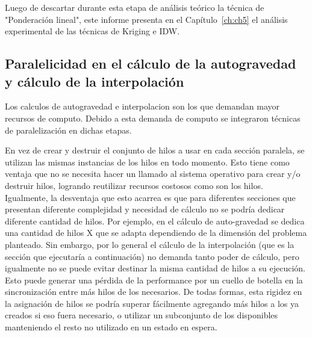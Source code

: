 \documentclass[a4paper,11pt]{book}
\begin{document}
Luego de descartar durante esta etapa de análisis teórico la técnica de "Ponderación lineal", este informe presenta en el Capítulo~\ref{ch:ch5} el análisis experimental de las técnicas de Kriging e IDW.


\subsection{Paralelicidad en el cálculo de la autogravedad y cálculo de la interpolación}



Los calculos de autogravedad e interpolacion son los que demandan mayor recursos de computo. Debido a esta demanda de computo se integraron técnicas de paralelización en dichas etapas.

En vez de crear y destruir el conjunto de hilos a usar en cada sección paralela, se utilizan las mismas instancias de los hilos en todo momento. Esto tiene como ventaja que no se necesita hacer un llamado al sistema operativo para crear y/o destruir hilos, logrando reutilizar recursos costosos como son los hilos. Igualmente, la desventaja que esto acarrea es que para diferentes secciones que presentan diferente complejidad y necesidad de cálculo no se podría dedicar diferente cantidad de hilos. Por ejemplo, en el cálculo de auto-gravedad se dedica una cantidad de hilos X que se adapta dependiendo de la dimensión del problema planteado. Sin embargo, por lo general el cálculo de la interpolación (que es la sección que ejecutaría a continuación) no demanda tanto poder de cálculo, pero igualmente no se puede evitar destinar la misma cantidad de hilos a su ejecución. Esto puede generar una pérdida de la performance por un cuello de botella en la sincronización entre más hilos de los necesarios. De todas formas, esta rigidez en la asignación de hilos se podría superar fácilmente agregando más hilos a los ya creados si eso fuera necesario, o utilizar un subconjunto de los disponibles manteniendo el resto no utilizado en un estado en espera.
\end{document}
